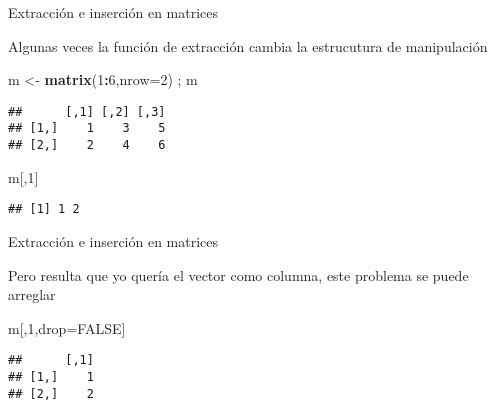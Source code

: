 \documentclass[ignorenonframetext,]{beamer}
\newenvironment{Shaded}{\begin{snugshade}}{\end{snugshade}}
\newcommand{\KeywordTok}[1]{\textcolor[rgb]{0.13,0.29,0.53}{\textbf{#1}}}
\newcommand{\DataTypeTok}[1]{\textcolor[rgb]{0.13,0.29,0.53}{#1}}
\newcommand{\DecValTok}[1]{\textcolor[rgb]{0.00,0.00,0.81}{#1}}
\newcommand{\StringTok}[1]{\textcolor[rgb]{0.31,0.60,0.02}{#1}}
\newcommand{\OtherTok}[1]{\textcolor[rgb]{0.56,0.35,0.01}{#1}}
\newcommand{\OperatorTok}[1]{\textcolor[rgb]{0.81,0.36,0.00}{\textbf{#1}}}
\newcommand{\NormalTok}[1]{#1}
\begin{document}
\begin{frame}[fragile]{Extracción e inserción en matrices}

Algunas veces la función de extracción cambia la estrucutura de
manipulación

\begin{Shaded}
\begin{Highlighting}[]
\NormalTok{m <-}\StringTok{ }\KeywordTok{matrix}\NormalTok{(}\DecValTok{1}\OperatorTok{:}\DecValTok{6}\NormalTok{,}\DataTypeTok{nrow=}\DecValTok{2}\NormalTok{) ; m}
\end{Highlighting}
\end{Shaded}
\pause
\begin{verbatim}
##      [,1] [,2] [,3]
## [1,]    1    3    5
## [2,]    2    4    6
\end{verbatim}

\begin{Shaded}
\begin{Highlighting}[]
\NormalTok{m[,}\DecValTok{1}\NormalTok{]}
\end{Highlighting}
\end{Shaded}
\pause
\begin{verbatim}
## [1] 1 2
\end{verbatim}

\end{frame}

\begin{frame}[fragile]{Extracción e inserción en matrices}

Pero resulta que yo quería el vector como columna, este problema se
puede arreglar

\begin{Shaded}
\begin{Highlighting}[]
\NormalTok{m[,}\DecValTok{1}\NormalTok{,drop=}\OtherTok{FALSE}\NormalTok{]}
\end{Highlighting}
\end{Shaded}
\pause
\begin{verbatim}
##      [,1]
## [1,]    1
## [2,]    2
\end{verbatim}

\end{frame}
\end{document}
